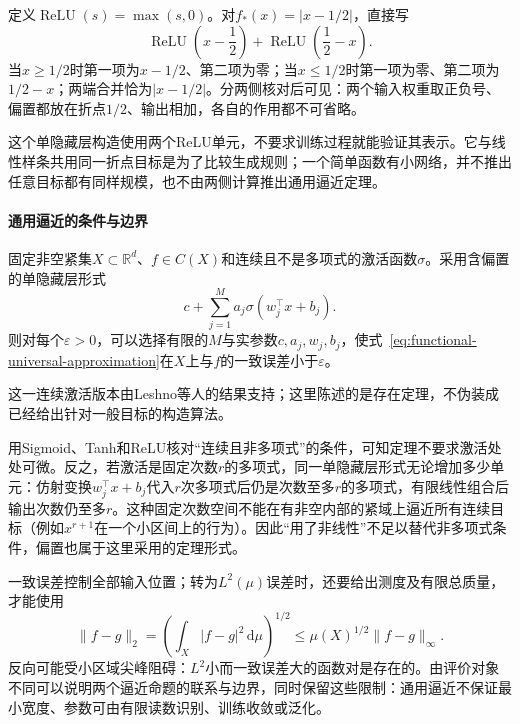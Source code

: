 \begin{example}[折点函数的两ReLU表示]
定义$\operatorname{ReLU}(s)=\max(s,0)$。对$f_*(x)=|x-1/2|$，直接写
\[
  \operatorname{ReLU}\!\left(x-\frac12\right)
  +\operatorname{ReLU}\!\left(\frac12-x\right).
\]
当$x\ge1/2$时第一项为$x-1/2$、第二项为零；当$x\le1/2$时第一项为零、第二项为$1/2-x$；两端合并恰为$|x-1/2|$。分两侧核对后可见：两个输入权重取正负号、偏置都放在折点$1/2$、输出相加，各自的作用都不可省略。
\end{example}

这个单隐藏层构造使用两个ReLU单元，不要求训练过程就能验证其表示。它与线性样条共用同一折点目标是为了比较生成规则；一个简单函数有小网络，并不推出任意目标都有同样规模，也不由两侧计算推出通用逼近定理。

\paragraph{通用逼近的条件与边界}

\begin{theorem}[单隐藏层通用逼近]
固定非空紧集$X\subset\mathbb R^d$、$f\in C(X)$和连续且不是多项式的激活函数$\sigma$。采用含偏置的单隐藏层形式
\begin{equation}
  c+\sum_{j=1}^{M}a_j\sigma(w_j^{\top}x+b_j).
  \label{eq:functional-universal-approximation}
\end{equation}
则对每个$\varepsilon>0$，可以选择有限的$M$与实参数$c,a_j,w_j,b_j$，使式~\eqref{eq:functional-universal-approximation}在$X$上与$f$的一致误差小于$\varepsilon$。
\end{theorem}

这一连续激活版本由Leshno等人的结果支持；这里陈述的是存在定理，不伪装成已经给出针对一般目标的构造算法。

用Sigmoid、Tanh和ReLU核对“连续且非多项式”的条件，可知定理不要求激活处处可微。反之，若激活是固定次数$r$的多项式，同一单隐藏层形式无论增加多少单元：仿射变换$w_j^\top x+b_j$代入$r$次多项式后仍是次数至多$r$的多项式，有限线性组合后输出次数仍至多$r$。这种固定次数空间不能在有非空内部的紧域上逼近所有连续目标（例如$x^{r+1}$在一个小区间上的行为）。因此“用了非线性”不足以替代非多项式条件，偏置也属于这里采用的定理形式。

一致误差控制全部输入位置；转为$L^2(\mu)$误差时，还要给出测度及有限总质量，才能使用
\[
  \|f-g\|_2=\left(\int_X|f-g|^2\,\mathrm d\mu\right)^{1/2}
  \le\mu(X)^{1/2}\|f-g\|_\infty.
\]
反向可能受小区域尖峰阻碍：$L^2$小而一致误差大的函数对是存在的。由评价对象不同可以说明两个逼近命题的联系与边界，同时保留这些限制：通用逼近不保证最小宽度、参数可由有限读数识别、训练收敛或泛化。

